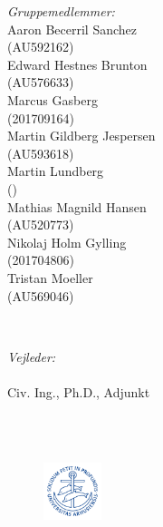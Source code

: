 \begin{titlepage}
\begin{minipage}{0.4\textwidth}
\begin{flushleft} \small
\emph{Gruppemedlemmer:}
\\Aaron Becerril Sanchez\\ (AU592162)
\\Edward Hestnes Brunton\\ (AU576633)
\\Marcus Gasberg\\ (201709164) 
\\Martin Gildberg Jespersen\\ (AU593618) 
\\Martin Lundberg\\ () 
\\Mathias Magnild Hansen\\ (AU520773)
\\Nikolaj Holm Gylling\\ (201704806)
\\Tristan Moeller\\ (AU569046)
\end{flushleft}
\end{minipage}
~
\begin{minipage}{0.4\textwidth}
\begin{flushright} \small
\emph{Vejleder:} \\
\vejleder \\ Civ. Ing., Ph.D., Adjunkt %
\end{flushright}
\end{minipage}\\[1cm]



{\large \afleveringsdato}\\[1cm] %


\begin{figure}[H]
    \centering
    \includegraphics[width=0.15\textwidth]{Setup/graphics/AU.png}
\end{figure}

\vfill
\end{titlepage}